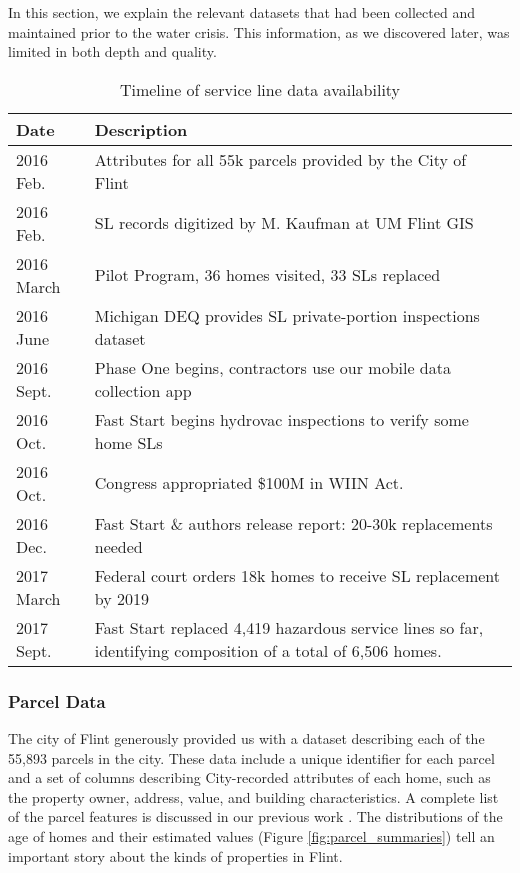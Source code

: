 \documentclass[sigconf]{acmart}
\newcommand{\urlformat}[1]{\emph{ #1}}
\begin{document}
In this section, we explain the relevant datasets that had been collected and maintained prior to the water crisis. This information, as we discovered later, was limited in both depth and quality.


\begin{table}[!t]
\footnotesize{
    \begin{tabular}{ p{0.45in}p{2.7in} }
    \hline
    Date & Description \\
    \hline
    2016 Feb. & Attributes for all 55k parcels provided by the City of Flint \\
    2016 Feb. & SL records digitized by M. Kaufman at UM Flint GIS \\
    2016 March & Pilot Program, 36 homes visited, 33 SLs replaced\\
    2016 June & Michigan DEQ provides SL private-portion inspections dataset\\
    2016 Sept. & Phase One begins, contractors use our mobile data collection app \\
    2016 Oct. & Fast Start begins hydrovac inspections to verify some home SLs\\
    2016 Oct. & Congress appropriated \$100M in WIIN Act. \\
    2016 Dec. & Fast Start \& authors release report: 20-30k replacements needed\\
    2017 March & Federal court orders 18k homes to receive SL replacement by 2019 \\
    2017 Sept. & Fast Start replaced 4,419 hazardous service lines so far, identifying  composition of a total of 6,506 homes.\\
    \hline
    \end{tabular}
} %
\caption{Timeline of service line data availability}\label{tbl:data_history}
\end{table}

\subsubsection{Parcel Data}


The city of Flint generously provided us with a dataset describing each of the 55,893 parcels in the city. These data include a unique identifier for each parcel and a set of columns describing City-recorded attributes of each home, such as the property owner, address, value, and building characteristics. A complete list of the parcel features is discussed in our previous work \cite{chojnackietal2017kdd}. The distributions of the age of homes and their estimated values (Figure \ref{fig:parcel_summaries}) tell an important story about the kinds of properties in Flint. %
\end{document}
